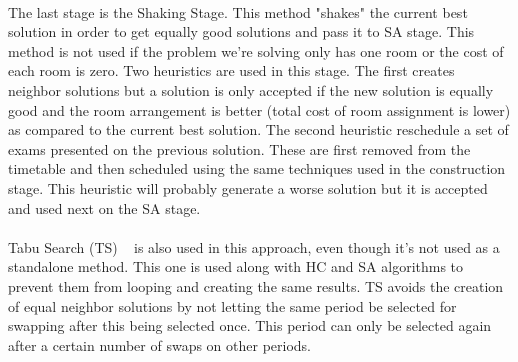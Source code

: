 \\
The last stage is the Shaking Stage. This method "shakes" the current best solution in order to get equally good solutions and pass it to SA stage. This method is not used if the problem we're solving only has one room or the cost of each room is zero. Two heuristics are used in this stage. The first creates neighbor solutions but a solution is only accepted if the new solution is equally good and the room arrangement is better (total cost of room assignment is lower) as compared to the current best solution. The second heuristic reschedule a set of exams presented on the previous solution. These are first removed from the timetable and then scheduled using the same techniques used in the construction stage. This heuristic will probably generate a worse solution but it is accepted and used next on the SA stage.\\
\\
Tabu Search (TS) ~\cite{Talbi2009} is also used in this approach, even though it's not used as a standalone method. This one is used along with HC and SA algorithms to prevent them from looping and creating the same results. TS avoids the creation of equal neighbor solutions by not letting the same period be selected for swapping after this being selected once. This period can only be selected again after a certain number of swaps on other periods.\\
\\
